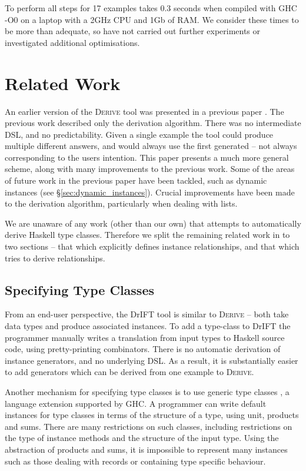 \documentclass{llncs}
\newcommand{\derive}{\textsc{Derive}}
\begin{document}
To perform all steps for 17 examples takes 0.3 seconds when compiled with GHC -O0 on a laptop with a 2GHz CPU and 1Gb of RAM. We consider these times to be more than adequate, so have not carried out further experiments or investigated additional optimisations.

\section{Related Work}
\label{sec:related}

An earlier version of the \derive{} tool was presented in a previous paper \cite{me:yds_derive}. The previous work described only the derivation algorithm. There was no intermediate DSL, and no predictability. Given a single example the tool could produce multiple different answers, and would always use the first generated -- not always corresponding to the users intention. This paper presents a much more general scheme, along with many improvements to the previous work. Some of the areas of future work in the previous paper have been tackled, such as dynamic instances (see \S\ref{sec:dynamic_instances}). Crucial improvements have been made to the derivation algorithm, particularly when dealing with lists.

We are unaware of any work (other than our own) that attempts to automatically derive Haskell type classes. Therefore we split the remaining related work in to two sections -- that which explicitly defines instance relationships, and that which tries to derive relationships.

\subsection{Specifying Type Classes}

From an end-user perspective, the DrIFT tool \cite{drift} is similar to \derive{} -- both take data types and produce associated instances. To add a type-class to DrIFT the programmer manually writes a translation from input types to Haskell source code, using pretty-printing combinators. There is no automatic derivation of instance generators, and no underlying DSL. As a result, it is substantially easier to add generators which can be derived from one example to \derive{}.

Another mechanism for specifying type classes is to use generic type classes \cite{hinze:derivable_type_classes}, a language extension supported by GHC. A programmer can write default instances for type classes in terms of the structure of a type, using unit, products and sums. There are many restrictions on such classes, including restrictions on the type of instance methods and the structure of the input type. Using the abstraction of products and sums, it is impossible to represent many instances such as those dealing with records or containing type specific behaviour.
\end{document}

